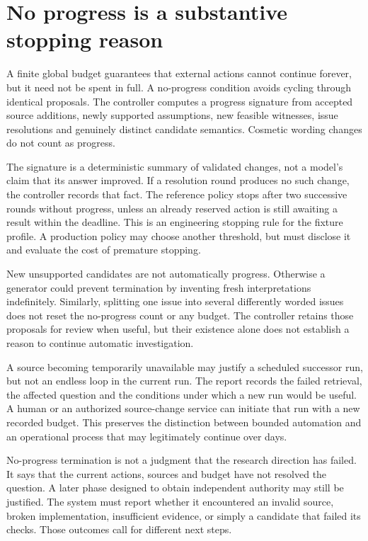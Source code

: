 \documentclass[12pt,a4paper,oneside,openany]{book}
\begin{document}
\section{No progress is a substantive stopping reason}

A finite global budget guarantees that external actions cannot continue forever,
but it need not be spent in full. A no-progress condition avoids cycling through
identical proposals. The controller computes a progress signature from accepted
source additions, newly supported assumptions, new feasible witnesses, issue
resolutions and genuinely distinct candidate semantics. Cosmetic wording changes
do not count as progress.

The signature is a deterministic summary of validated changes, not a model's
claim that its answer improved. If a resolution round produces no such change,
the controller records that fact. The reference policy stops after two successive
rounds without progress, unless an already reserved action is still awaiting a
result within the deadline. This is an engineering stopping rule for the fixture
profile. A production policy may choose another threshold, but must disclose it
and evaluate the cost of premature stopping.

New unsupported candidates are not automatically progress. Otherwise a generator
could prevent termination by inventing fresh interpretations indefinitely.
Similarly, splitting one issue into several differently worded issues does not
reset the no-progress count or any budget. The controller retains those proposals
for review when useful, but their existence alone does not establish a reason to
continue automatic investigation.

A source becoming temporarily unavailable may justify a scheduled successor run,
but not an endless loop in the current run. The report records the failed
retrieval, the affected question and the conditions under which a new run would
be useful. A human or an authorized source-change service can initiate that run
with a new recorded budget. This preserves the distinction between bounded
automation and an operational process that may legitimately continue over days.

No-progress termination is not a judgment that the research direction has failed.
It says that the current actions, sources and budget have not resolved the
question. A later phase designed to obtain independent authority may still be
justified. The system must report whether it encountered an invalid source,
broken implementation, insufficient evidence, or simply a candidate that failed
its checks. Those outcomes call for different next steps.
\end{document}

